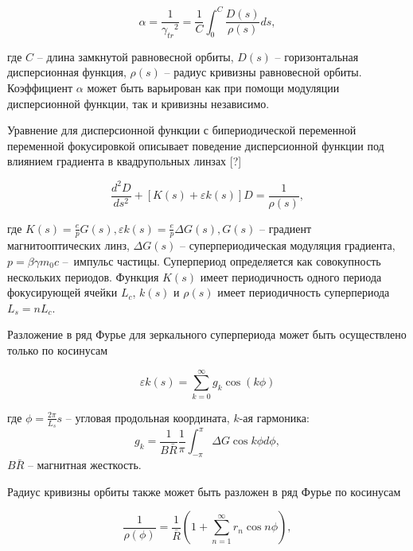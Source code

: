 \begin{equation}
\alpha=\frac{1}{{\gamma_{tr}}^2}=\frac{1}{C}\int_{0}^{C}\frac{D\left(s\right)}{\rho\left(s\right)}ds,
\label{eq:alpha}
\end{equation}

\noindent где $C$ – длина замкнутой равновесной орбиты, $D(s)$ – горизонтальная дисперсионная функция, $\rho(s)$ – радиус кривизны равновесной орбиты. Коэффициент $\alpha$ может быть варьирован как при помощи модуляции дисперсионной функции, так и кривизны независимо.

Уравнение для дисперсионной функции с бипериодической переменной переменной фокусировкой описывает поведение дисперсионной функции под влиянием градиента в квадрупольных линзах [?]

\begin{equation}
\frac{d^2D}{ds^2}+\left[K(s)+\varepsilon k(s)\right]D=\frac{1}{\rho(s)} ,
\label{eq:disp_eq}
\end{equation}

\noindent где $K\left(s\right)=\frac{e}{p}G\left(s\right), \varepsilon k\left(s\right)=\frac{e}{p}\Delta G\left(s\right), G\left(s\right)$ – градиент магнитооптических линз, $\Delta G\left(s\right)$ – суперпериодическая модуляция градиента, $p=\beta\gamma m_0 c$ – импульс частицы. Суперпериод определяется как совокупность нескольких периодов. Функция $K\left(s\right)$ имеет периодичность одного периода фокусирующей ячейки $L_{c}$, $k(s)$ и $\rho(s)$ имеет периодичность суперпериода $L_s = n L_c$.

Разложение в ряд Фурье для зеркального суперпериода может быть осуществлено только по косинусам

\begin{equation}
\varepsilon k\left(s\right)=\sum_{k=0}^{\infty}g_{k}\cos(k\phi)
\label{eq:superperiodicity_fourier}
\end{equation}

\noindent где $\phi=\frac{2\pi}{L_s}s$ -- угловая продольная координата, $k$-ая гармоника:
\begin{equation}
g_k=\frac{1}{B\bar{R}} \frac{1}{\pi} \int_{-\pi}^\pi \Delta G \cos k \phi d \phi,
\end{equation}
\noindent $B\bar{R}$ -- магнитная жесткость.

\noindent Радиус кривизны орбиты также может быть разложен в ряд Фурье по косинусам

\begin{equation}
\frac{1}{\rho(\phi)}=\frac{1}{\bar{R}}\left(1+\sum_{n=1}^{\infty} r_n \cos n \phi\right),
\end{equation}

